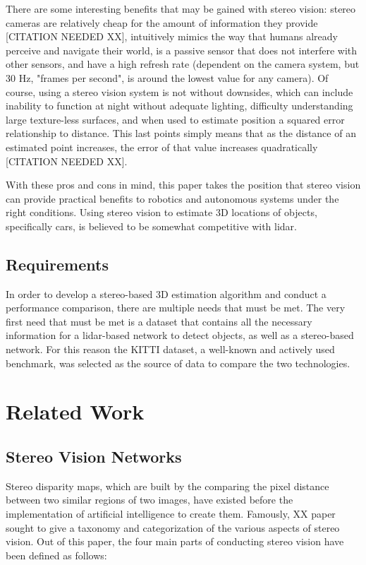 There are some interesting benefits that may be gained with stereo vision: stereo cameras are relatively cheap for the amount of information they provide [CITATION NEEDED XX], intuitively mimics the way that humans already perceive and navigate their world, is a passive sensor that does not interfere with other sensors, and have a high refresh rate (dependent on the camera system, but 30 Hz, "frames per second", is around the lowest value for any camera). Of course, using a stereo vision system is not without downsides, which can include inability to function at night without adequate lighting, difficulty understanding large texture-less surfaces, and when used to estimate position a squared error relationship to distance. This last points simply means that as the distance of an estimated point increases, the error of that value increases quadratically [CITATION NEEDED XX]. 

With these pros and cons in mind, this paper takes the position that stereo vision can provide practical benefits to robotics and autonomous systems under the right conditions. Using stereo vision to estimate 3D locations of objects, specifically cars, is believed to be somewhat competitive with lidar.


\subsection{Requirements}
In order to develop a stereo-based 3D estimation algorithm and conduct a performance comparison, there are multiple needs that must be met. The very first need that must be met is a dataset that contains all the necessary information for a lidar-based network to detect objects, as well as a stereo-based network. For this reason the KITTI dataset, a well-known and actively used benchmark, was selected as the source of data to compare the two technologies.

\section{Related Work}
\subsection{Stereo Vision Networks}
Stereo disparity maps, which are built by the comparing the pixel distance between two similar regions of two images, have existed before the implementation of artificial intelligence to create them. Famously, XX paper sought to give a taxonomy and categorization of the various aspects of stereo vision. Out of this paper, the four main parts of conducting stereo vision have been defined as follows: 


